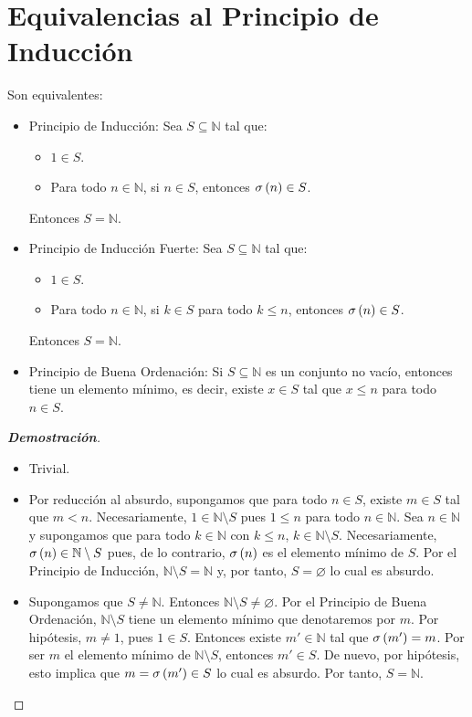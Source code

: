 \section{Equivalencias al Principio de Inducción}

\begin{theorem}
\rm Son equivalentes:

\begin{itemize}
    \item[1.] Principio de Inducción: Sea $S\subseteq\mathbb{N}$ tal que:
    \begin{itemize}
        \item[(i)] $1\in S$.
        \item[(ii)] Para todo $n\in\mathbb{N}$, si $n\in S$, entonces $\sigma\left(n\right)\in S$.
    \end{itemize}
    Entonces $S=\mathbb{N}$.
    \item[2.] Principio de Inducción Fuerte: Sea $S\subseteq\mathbb{N}$ tal que:
    \begin{itemize}
        \item[(i)] $1\in S$.
        \item[(ii)] Para todo $n\in\mathbb{N}$, si $k\in S$ para todo $k\leq n$, entonces $\sigma\left(n\right)\in S$.
    \end{itemize}
    Entonces $S=\mathbb{N}$.
    \item[3.] Principio de Buena Ordenación: Si $S\subseteq\mathbb{N}$ es un conjunto no vacío, entonces tiene un elemento mínimo, es decir, existe $x\in S$ tal que $x\leq n$ para todo $n\in S$.
\end{itemize}
\begin{proof}[\rm\textbf{Demostración}]
\rm\hfill
\begin{itemize}
    \item[\boxed{1\Rightarrow2}] Trivial.
    \item[\boxed{2\Rightarrow3}] Por reducción al absurdo, supongamos que para todo $n\in S$, existe $m\in S$ tal que $m<n$. Necesariamente, $1\in\mathbb{N}\setminus S$ pues $1\leq n$ para todo $n\in\mathbb{N}$. Sea $n\in\mathbb{N}$ y supongamos que para todo $k\in\mathbb{N}$ con $k\leq n$, $k\in\mathbb{N}\setminus S$. Necesariamente, $\sigma\left(n\right)\in\mathbb{N}\setminus S$ pues, de lo contrario, $\sigma\left(n\right)$ es el elemento mínimo de $S$. Por el Principio de Inducción, $\mathbb{N}\setminus S=\mathbb{N}$ y, por tanto, $S=\varnothing$ lo cual es absurdo.  
    \item[\boxed{3\Rightarrow1}] Supongamos que $S\neq\mathbb{N}$. Entonces $\mathbb{N}\setminus S\neq\varnothing$. Por el Principio de Buena Ordenación, $\mathbb{N}\setminus S$ tiene un elemento mínimo que denotaremos por $m$. Por hipótesis, $m\neq 1$, pues $1\in S$. Entonces existe $m'\in\mathbb{N}$ tal que $\sigma\left(m'\right)=m$. Por ser $m$ el elemento mínimo de $\mathbb{N}\setminus S$, entonces $m'\in S$. De nuevo, por hipótesis, esto implica que $m=\sigma\left(m'\right)\in S$ lo cual es absurdo. Por tanto, $S=\mathbb{N}$.
\end{itemize}
\end{proof}
\end{theorem}

